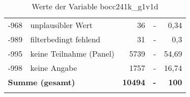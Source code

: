 \begin{longtable}{Xlrrr}
       -968 & unplausibler Wert & 36 & - & 0,34 \\

       -989 & filterbedingt fehlend & 31 & - & 0,3 \\

       -995 & keine Teilnahme (Panel) & 5739 & - & 54,69 \\

       -998 & keine Angabe & 1757 & - & 16,74 \\

     \midrule
     \multicolumn{2}{l}{\textbf{Summe (gesamt)}} & \textbf{10494} & \textbf{-} & \textbf{100} \\
     \bottomrule
     \caption{Werte der Variable bocc241k\_g1v1d}
     \end{longtable}
     
